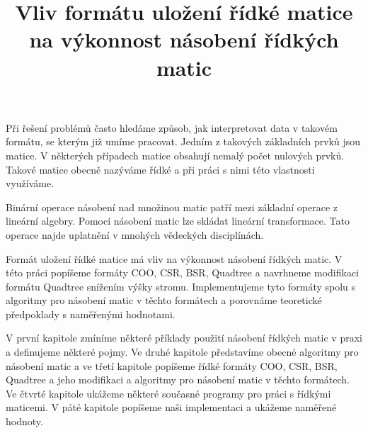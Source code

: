 \documentclass[thesis=B,czech]{FITthesis}[2012/06/26]
\title{Vliv formátu uložení řídké matice na výkonnost násobení řídkých matic}
\begin{document}

\begin{introduction}

Při řešení problémů často hledáme způsob, jak interpretovat data v takovém formátu, se kterým již umíme pracovat. Jedním z takových základních prvků jsou matice. V některých případech matice obsahují nemalý počet nulových prvků. Takové matice obecně nazýváme řídké a při práci s nimi této vlastnosti využíváme.

Binární operace násobení nad množinou matic patří mezi základní operace z lineární algebry. Pomocí násobení matic lze skládat lineární transformace. Tato operace najde uplatnění v mnohých vědeckých disciplínách.

Formát uložení řídké matice má vliv na výkonnost násobení řídkých matic. V této práci popíšeme formáty COO, CSR, BSR, Quadtree a navrhneme modifikaci formátu Quadtree snížením výšky stromu. Implementujeme tyto formáty spolu s algoritmy pro násobení matic v těchto formátech a porovnáme teoretické předpoklady s naměřenými hodnotami.

V první kapitole zmíníme některé příklady použití násobení řídkých matic v praxi a definujeme některé pojmy. Ve druhé kapitole představíme obecné algoritmy pro násobení matic a ve třetí kapitole popíšeme řídké formáty COO, CSR, BSR, Quadtree a jeho modifikaci a algoritmy pro násobení matic v těchto formátech. Ve čtvrté kapitole ukážeme některé současné programy pro práci s řídkými maticemi. V páté kapitole popíšeme naši implementaci a ukážeme naměřené hodnoty.

\end{introduction}

\end{document}
